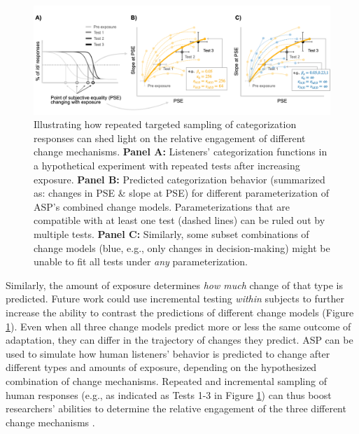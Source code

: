 \documentclass[
  11pt,
  man,floatsintext]{apa6}
\begin{document}
\begin{figure}[h]
\begin{center}
\includegraphics[width=1 \columnwidth]{../figures/diagrams/repeated-sampling.png}
\caption{Illustrating how repeated targeted sampling of categorization responses can shed light on the relative engagement of different change mechanisms. {\bf Panel A:} Listeners’ categorization functions in a hypothetical experiment with repeated tests after increasing exposure. {\bf Panel B:} Predicted categorization behavior (summarized as: changes in PSE \& slope at PSE) for different parameterization of ASP’s combined change models. Parameterizations that are compatible with at least one test (dashed lines) can be ruled out by multiple tests. {\bf Panel C:} Similarly, some subset combinations of change models (blue, e.g., only changes in decision-making) might be unable to fit all tests under {\it any} parameterization.}\label{fig:repeated-sampling}
\end{center}
\end{figure}

Similarly, the amount of exposure determines \emph{how much} change of that type is predicted.
Future work could use incremental testing \emph{within} subjects to further increase the ability to contrast the predictions of different change models (Figure \ref{fig:repeated-sampling}). Even when all three change models predict more or less the same outcome of adaptation, they can differ in the trajectory of changes they predict. ASP can be used to simulate how human listeners' behavior is predicted to change after different types and amounts of exposure, depending on the hypothesized combination of change mechanisms. Repeated and incremental sampling of human responses (e.g., as indicated as Tests 1-3 in Figure \ref{fig:repeated-sampling}) can thus boost researchers' abilities to determine the relative engagement of the three different change mechanisms \autocites[for initial efforts to implement repeated testing, see][]{tan2022,xie-kurumada2023}.
\end{document}
